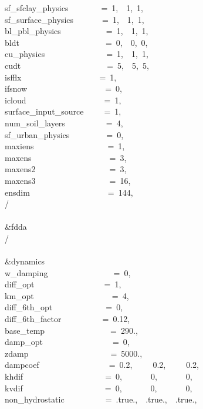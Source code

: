 sf\_sfclay\_physics~~~~~~~~=~1,~~1,~1,~\\
sf\_surface\_physics~~~~~~~=~1,~~1,~1,~\\
bl\_pbl\_physics~~~~~~~~~~~=~1,~~1,~1,~\\
bldt~~~~~~~~~~~~~~~~~~~~~=~0,~~0,~0,~\\
cu\_physics~~~~~~~~~~~~~~~=~1,~~1,~1,~\\
cudt~~~~~~~~~~~~~~~~~~~~~=~5,~~5,~5,~\\
isfflx~~~~~~~~~~~~~~~~~~~=~1,\\
ifsnow~~~~~~~~~~~~~~~~~~~=~0,\\
icloud~~~~~~~~~~~~~~~~~~~=~1,\\
surface\_input\_source~~~~~=~1,\\
num\_soil\_layers~~~~~~~~~~=~4,\\
sf\_urban\_physics~~~~~~~~~=~0,~~\\
maxiens~~~~~~~~~~~~~~~~~~=~1,\\
maxens~~~~~~~~~~~~~~~~~~~=~3,\\
maxens2~~~~~~~~~~~~~~~~~~=~3,\\
maxens3~~~~~~~~~~~~~~~~~~=~16,\\
ensdim~~~~~~~~~~~~~~~~~~~=~144,\\
/\\
\\
\&fdda~~~~~~~~~~~~~~~~~~~~\\
/\\
\\
\&dynamics~~~~~~~~~~~~~~~~\\
w\_damping~~~~~~~~~~~~~~~~=~0,\\
diff\_opt~~~~~~~~~~~~~~~~~=~1,\\
km\_opt~~~~~~~~~~~~~~~~~~~=~4,\\
diff\_6th\_opt~~~~~~~~~~~~~=~0,~~~~~~~~\\
diff\_6th\_factor~~~~~~~~~~=~0.12,~~~~~\\
base\_temp~~~~~~~~~~~~~~~~=~290.,\\
damp\_opt~~~~~~~~~~~~~~~~~=~0,\\
zdamp~~~~~~~~~~~~~~~~~~~~=~5000.,~~~~\\
dampcoef~~~~~~~~~~~~~~~~~=~0.2,~~~~~0.2,~~~~~0.2,~~~~~~~~\\
khdif~~~~~~~~~~~~~~~~~~~~=~0,~~~~~~~0,~~~~~~~0,~~~~~~~~~~\\
kvdif~~~~~~~~~~~~~~~~~~~~=~0,~~~~~~~0,~~~~~~~0,~~~~~~~~~~\\
non\_hydrostatic~~~~~~~~~~=~.true.,~~.true.,~~.true.,~~~~~\\
